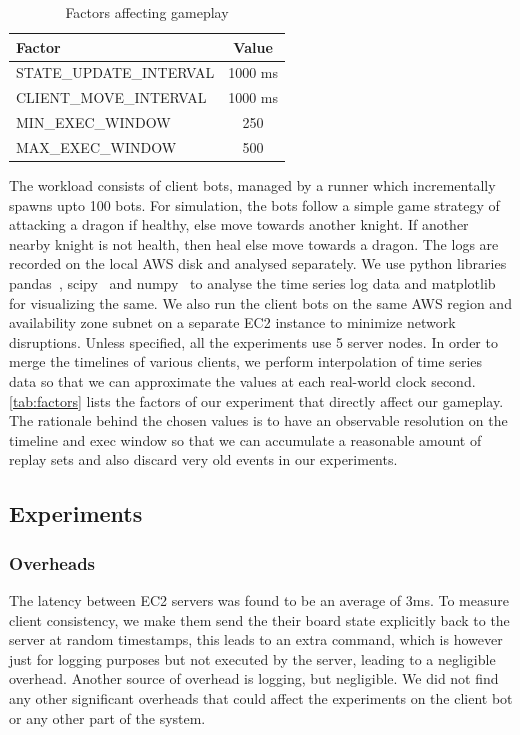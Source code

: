 \documentclass[a4paper]{IEEEtran}
\begin{document}
  \begin{table}[tbp]
    \centering
    \caption{Factors affecting gameplay}
    \label{tab:factors}
    \begin{tabular}{| l | c |}
      \hline
      Factor & Value \\
      \hline
      \textsc{STATE\_UPDATE\_INTERVAL} & 1000 ms \\
      \textsc{CLIENT\_MOVE\_INTERVAL} & 1000 ms \\
      \textsc{MIN\_EXEC\_WINDOW} & 250 \\
      \textsc{MAX\_EXEC\_WINDOW} & 500 \\
      \hline
    \end{tabular}
  \end{table} 

  The workload consists of client bots, managed by a runner which incrementally spawns upto 100 bots. For simulation, the bots follow a simple game strategy of attacking a dragon if healthy, else move towards another knight. If another nearby knight is not health, then heal else move towards a dragon. The logs are recorded on the local AWS disk and analysed separately.
  We use python libraries pandas~\cite{pandas}, scipy~\cite{scipy} and numpy~\cite{numpy} to analyse the time series log data and matplotlib~\cite{matplotlib} for visualizing the same. We also run the client bots on the same AWS region and availability zone subnet on a separate EC2 instance to minimize network disruptions. Unless specified, all the experiments use 5 server nodes. In order to merge the timelines of various clients, we perform interpolation of time series data so that we can approximate the values at each real-world clock second. \autoref{tab:factors} lists the factors of our experiment that directly affect our gameplay. The rationale behind the chosen values is to have an observable resolution on the timeline and exec window so that we can accumulate a reasonable amount of replay sets and also discard very old events in our experiments.

  \subsection{Experiments}
   
  \subsubsection{Overheads}

  The latency between EC2 servers was found to be an average of 3ms. To measure client consistency, we make them send the their board state explicitly back to the server at random timestamps, this leads to an extra command, which is however just for logging purposes but not executed by the server, leading to a negligible overhead. Another source of overhead is logging, but negligible. We did not find any other significant overheads that could affect the experiments on the client bot or any other part of the system.
  
\end{document}
